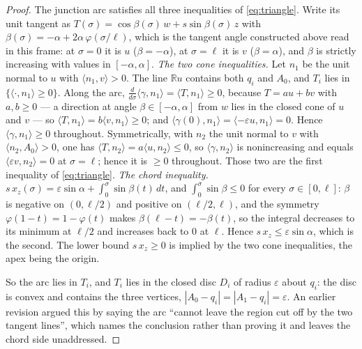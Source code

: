 \begin{proof}
The junction arc satisfies all three inequalities of \eqref{eq:triangle}. Write
its unit tangent as $T(\sigma)=\cos\beta(\sigma)\,w+s\sin\beta(\sigma)\,z$ with
$\beta(\sigma)=-\alpha+2\alpha\,\varphi(\sigma/\ell)$, which is the tangent
angle constructed above read in this frame: at $\sigma=0$ it is $u$
($\beta=-\alpha$), at $\sigma=\ell$ it is $v$ ($\beta=\alpha$), and $\beta$ is
strictly increasing with values in $[-\alpha,\alpha]$.
\emph{The two cone inequalities.} Let $n_1$ be the unit normal to $u$ with
$\langle n_1,v\rangle>0$. The line $\mathbb Ru$ contains both $q_i$ and $A_0$,
and $T_i$ lies in $\{\langle\cdot,n_1\rangle\geq0\}$. Along the arc,
$\tfrac{d}{d\sigma}\langle\gamma,n_1\rangle=\langle T,n_1\rangle\geq0$, because
$T=au+bv$ with $a,b\geq0$ --- a direction at angle $\beta\in[-\alpha,\alpha]$
from $w$ lies in the closed cone of $u$ and $v$ --- so
$\langle T,n_1\rangle=b\langle v,n_1\rangle\geq0$; and
$\langle\gamma(0),n_1\rangle=\langle-\varepsilon u,n_1\rangle=0$. Hence
$\langle\gamma,n_1\rangle\geq0$ throughout. Symmetrically, with $n_2$ the unit
normal to $v$ with $\langle n_2,A_0\rangle>0$, one has $\langle
T,n_2\rangle=a\langle u,n_2\rangle\leq0$, so $\langle\gamma,n_2\rangle$ is
nonincreasing and equals $\langle\varepsilon v,n_2\rangle=0$ at $\sigma=\ell$;
hence it is $\geq0$ throughout. Those two are the first inequality of
\eqref{eq:triangle}.
\emph{The chord inequality.} $s\,x_z(\sigma)=\varepsilon\sin\alpha+\int_0^\sigma
\sin\beta(t)\,dt$, and $\int_0^\sigma\sin\beta\leq0$ for every
$\sigma\in[0,\ell]$: $\beta$ is negative on $(0,\ell/2)$ and positive on
$(\ell/2,\ell)$, and the symmetry $\varphi(1-t)=1-\varphi(t)$ makes
$\beta(\ell-t)=-\beta(t)$, so the integral decreases to its minimum at
$\ell/2$ and increases back to $0$ at $\ell$. Hence $s\,x_z\leq\varepsilon
\sin\alpha$, which is the second. The lower bound $s\,x_z\geq0$ is implied by
the two cone inequalities, the apex being the origin.

So the arc lies in $T_i$, and $T_i$ lies in the closed disc $D_i$ of radius
$\varepsilon$ about $q_i$: the disc is convex and contains the three vertices,
$|A_0-q_i|=|A_1-q_i|=\varepsilon$. An earlier revision argued this by saying the
arc ``cannot leave the region cut off by the two tangent lines'', which names
the conclusion rather than proving it and leaves the chord side unaddressed.


\end{proof}
